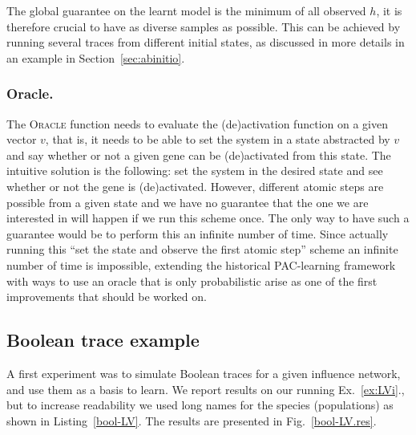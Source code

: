 \documentclass{llncs}
\newif\ifcomments%
\newcommand{\sylvain}[1]{\ifcomments\textcolor{green}{#1}\fi}
\begin{document}
The global guarantee on the learnt model is the minimum of all observed $h$,
it is therefore crucial to have as diverse samples as possible. This can be
achieved by running several traces from different initial states,
as discussed in more details in an example in Section~\ref{sec:abinitio}.

\sylvain{left this here, no idea what to do with it}

\subsubsection{Oracle.}
The \textsc{Oracle} function needs to evaluate the (de)activation function on a given vector $v$, that is, it needs to be able to set the system in a state abstracted by $v$ and say whether or not a given gene can be (de)activated from this state.
The intuitive solution is the following: set the system in the desired state and see whether or not the gene is (de)activated. 
However, different atomic steps are possible from a given state and we have no guarantee that the one we are interested in will happen if we run this scheme once. The only way to have such a guarantee would be to perform this an infinite number of time.
Since actually running this ``set the state and observe the first atomic step'' scheme an infinite number of time is impossible, extending the historical PAC-learning framework with ways to use an oracle that is only probabilistic arise as one of the first improvements that should be worked on.

\subsection{Boolean trace example}

A first experiment was to simulate Boolean traces for a given influence network, and use them as a basis to learn.
We report results on our running
Ex.~\ref{ex:LVi}., but to increase readability we used long names for the
species (populations) as shown in Listing~\ref{bool-LV}.
The results are presented in Fig.~\ref{bool-LV.res}.
\end{document}
